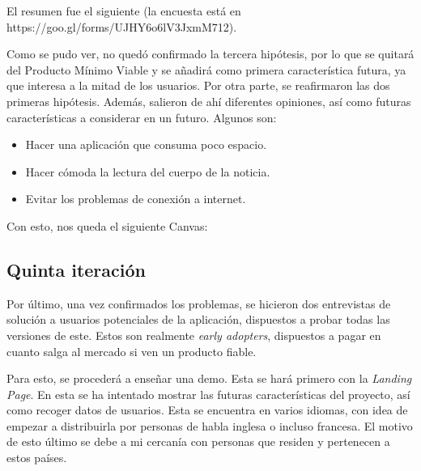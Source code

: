 El resumen fue el siguiente (la encuesta está en https://goo.gl/forms/UJHY6o6lV3JxmM712).



Como se pudo ver, no quedó confirmado la tercera hipótesis, por lo que se quitará del Producto Mínimo Viable y se añadirá como primera característica futura, ya que interesa a la mitad de los usuarios. Por otra parte, se reafirmaron las dos primeras hipótesis. Además, salieron de ahí diferentes opiniones, así como futuras características a considerar en un futuro. Algunos son:

\begin{itemize}
    \item Hacer una aplicación que consuma poco espacio.
    \item Hacer cómoda la lectura del cuerpo de la noticia.
    \item Evitar los problemas de conexión a internet.
\end{itemize}

Con esto, nos queda el siguiente Canvas:


\subsection{Quinta iteración}
Por último, una vez confirmados los problemas, se hicieron dos entrevistas de solución a usuarios potenciales de la aplicación, dispuestos a probar todas las versiones de este. Estos son realmente \textit{early adopters}, dispuestos a pagar en cuanto salga al mercado si ven un producto fiable.

Para esto, se procederá a enseñar una demo. Esta se hará primero con la \textit{Landing Page}. En esta se ha intentado mostrar las futuras características del proyecto, así como recoger datos de usuarios. Esta se encuentra en varios idiomas, con idea de empezar a distribuirla por personas de habla inglesa o incluso francesa. El motivo de esto último se debe a mi cercanía con personas que residen y pertenecen a estos países.

